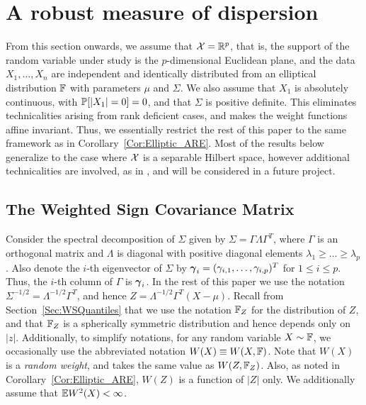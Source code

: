 \section{A robust measure of dispersion} 
\label{Sec:WSDispersion1}
From this section onwards, we assume that $\mathcal{X} = {\mathbb{R}}^{p}$, that is, the support of the 
random variable under study is the $p$-dimensional Euclidean plane, and the data 
$X_{1}, \ldots, X_{n}$ are independent and identically distributed from an 
elliptical distribution ${\mathbb{F}}$ with parameters $\mu$ and $\Sigma$.  We also 
assume that $X_{1}$ is absolutely continuous, with ${\mathbb{P}} [ | X_{1}| = 0] = 0$, 
and that $\Sigma$ is positive definite. This  eliminates technicalities arising from
 rank deficient cases, and makes the weight functions  affine invariant.
Thus, we essentially restrict the rest of this paper to the same  framework as in 
Corollary~\ref{Cor:Elliptic_ARE}. Most of the results below generalize to the case where 
$\mathcal{X}$ is a separable Hilbert space, however additional technicalities are involved, as in 
\cite{ref:AoS112852_Balietal_PCA_Functional_Robust}, and will be considered 
in a future project. 

\subsection{The Weighted Sign Covariance Matrix}
Consider the spectral decomposition of $\Sigma$ given by
 $\Sigma = \Gamma\Lambda\Gamma^T$, where $\Gamma$ is an orthogonal matrix 
 and $\Lambda$ is diagonal with positive diagonal elements $\lambda_1 \geq \ldots \geq 
 \lambda_p$.
Also denote the $i$-th eigenvector of $\Sigma$ by 
${\boldsymbol{\gamma}}_{i} = (\gamma_{i, 1}, \ldots, \gamma_{i, p})^T$ for $1 \leq i \leq p$. Thus, the 
$i$-th column of $\Gamma$ is ${\boldsymbol{\gamma}}_{i}$.
  In the rest of this paper we use the notation 
 $\Sigma^{-1/2} = \Lambda^{-1/2} \Gamma^{T}$, and 
 hence $Z = \Lambda^{-1/2} \Gamma^T (X - \mu)$. 
Recall from Section~\ref{Sec:WSQuantiles} that we use the notation ${\mathbb{F}}_{Z}$ for 
the distribution of $Z$, and that ${\mathbb{F}}_{Z}$ is a spherically symmetric distribution 
and hence depends only on $|z|$.
Additionally, to simplify notations, for any random variable $X \sim {\mathbb{F}}$, we occasionally 
use the abbreviated notation $W (X) \equiv W (X, {\mathbb{F}})$. Note that $W (X)$ is a 
\textit{random weight}, and takes the same value as $W (Z, {\mathbb{F}}_{Z})$.  
Also, as noted in  Corollary~\ref{Cor:Elliptic_ARE}, 
 $W (Z)$ is a function of $|Z|$ only. 
 We additionally assume that ${\mathbb{E}} W^{2} (X) < \infty$.
 
